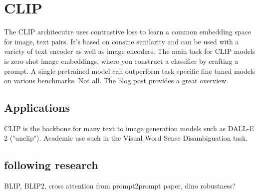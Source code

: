 \documentclass[11pt,a4paper]{article}
\begin{document}
\section{CLIP} %
The CLIP \cite{radford2021learning} architecutre uses contrastive loss to learn a common embedding space for image, text pairs.
It's based on consine similarity and can be used with a variety of text encoder as well as image encoders. 
The main task for CLIP models is zero shot image embeddings, where you construct a classifier by crafting a prompt.
A single pretrained model can outperform task specific fine tuned models on various benchmarks. Not all.
The blog post provides a great overview.

\subsection{Applications} %
CLIP is the backbone for many text to image generation models such as DALL-E 2 \cite{ramesh2022hierarchical} ("unclip").
Academic use such in the Visual Word Sense Disambiguation \cite{raganato-etal-2023-semeval} task.

\subsection{following research} %
BLIP, BLIP2, cross attention from prompt2prompt paper, dino robustness?




\clearpage



\appendix
\end{document}
